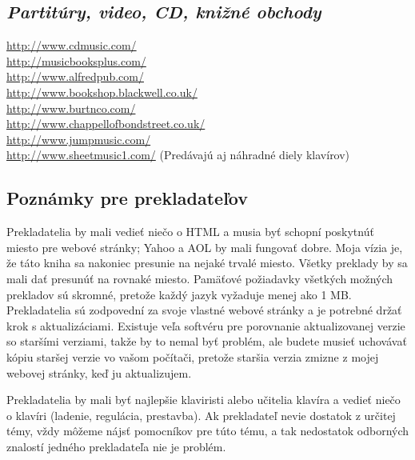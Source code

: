 \subsection*{\textit{Partitúry, video, CD, knižné obchody}}
\href{http://www.cdmusic.com/}{http://www.cdmusic.com/}\\
\href{http://musicbooksplus.com/}{http://musicbooksplus.com/}\\
\href{http://www.alfredpub.com/}{http://www.alfredpub.com/}\\
\href{http://www.bookshop.blackwell.co.uk/}{http://www.bookshop.blackwell.co.uk/}\\
\href{http://www.burtnco.com/}{http://www.burtnco.com/}\\
\href{http://www.chappellofbondstreet.co.uk/}{http://www.chappellofbondstreet.co.uk/}\\
\href{http://www.jumpmusic.com/}{http://www.jumpmusic.com/}\\
\href{http://www.sheetmusic1.com/}{http://www.sheetmusic1.com/} (Predávajú aj náhradné diely klavírov)

\subsection*{Poznámky pre prekladateľov}
\label{subsec:poznamky-pre-prekladatelov}
Prekladatelia by mali vedieť niečo o HTML a musia byť schopní poskytnúť miesto pre webové stránky; Yahoo a AOL by mali fungovať dobre. Moja vízia je, že táto kniha sa nakoniec presunie na nejaké  trvalé miesto. Všetky preklady by sa mali dať presunúť na rovnaké miesto. Pamäťové požiadavky všetkých možných prekladov sú skromné, pretože každý jazyk vyžaduje menej ako 1 MB. Prekladatelia sú zodpovední za svoje vlastné webové stránky a je potrebné držať krok s aktualizáciami. Existuje veľa softvéru pre porovnanie aktualizovanej verzie so staršími verziami, takže by to nemal byť problém, ale budete musieť uchovávať kópiu staršej verzie vo vašom počítači, pretože staršia verzia zmizne z mojej webovej stránky, keď ju aktualizujem.
\medskip

Prekladatelia by mali byť najlepšie klaviristi alebo učitelia klavíra a vedieť niečo o klavíri (ladenie, regulácia, prestavba). Ak prekladateľ nevie dostatok z určitej témy, vždy môžeme nájsť pomocníkov pre túto tému, a tak nedostatok odborných znalostí jedného prekladateľa nie je problém.
\medskip

